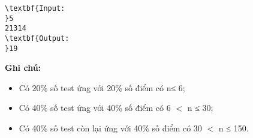 \begin{verbatim}
\textbf{Input:
}5
21314
\textbf{Output:
}19 
\end{verbatim}

\textbf{\textbf{Ghi chú:}}
\begin{itemize}
	\item Có 20\% số test ứng với 20\% số điểm có n≤ 6;
	\item Có 40\% số test ứng với 40\% số điểm có 6 $<$ n ≤ 30;
	\item Có 40\% số test còn lại ứng với 40\% số điểm có 30 $<$ n ≤ 150.
\end{itemize}
